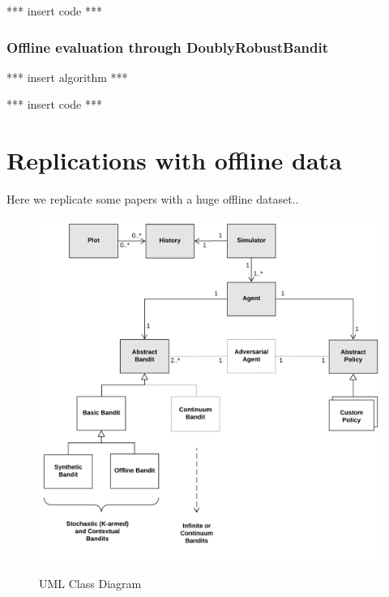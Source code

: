 \documentclass[nojss]{jss}\usepackage[]{graphicx}\usepackage[]{color}
\begin{document}
*** insert code ***


\subsubsection{Offline evaluation through DoublyRobustBandit}



*** insert algorithm ***


*** insert code ***

\section{Replications with offline data}

Here we replicate some papers with a huge offline dataset..

\begin{figure}[H]
  \centering
    \includegraphics[width=.99\textwidth]{fig/contextual_class}
    \label{fig:contextual_class}
      \caption{ UML Class Diagram}
\end{figure}
\end{document}

